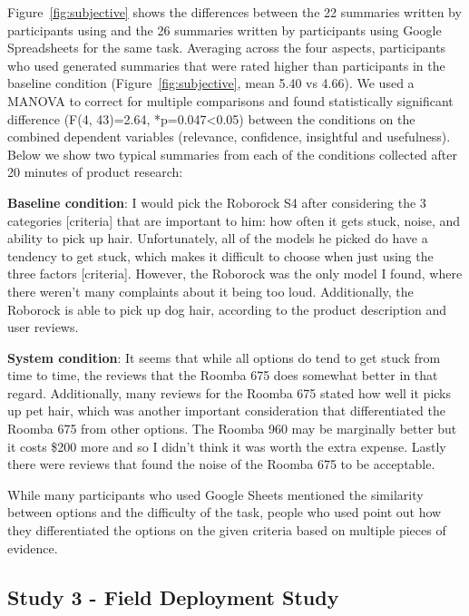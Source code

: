 Figure~\ref{fig:subjective} shows the differences between the 22 summaries written by participants using \SYSTEM and the 26 summaries written by participants using Google Spreadsheets for the same task. Averaging across the four aspects, participants who used \SYSTEM generated summaries that were rated higher than participants in the baseline condition (Figure~\ref{fig:subjective}, mean 5.40 vs 4.66). We used a MANOVA to correct for multiple comparisons and found statistically significant difference (F(4, 43)=2.64, *p=0.047<0.05) between the conditions on the combined dependent variables (relevance, confidence, insightful and usefulness). Below we show two typical summaries from each of the conditions collected after 20 minutes of product research:

\begin{tightquote}
\textbf{Baseline condition}: I would pick the Roborock S4 after considering the 3 categories [criteria] that are important to him: how often it gets stuck, noise, and ability to pick up hair. Unfortunately, all of the models he picked do have a tendency to get stuck, which makes it difficult to choose when just using the three factors [criteria]. However, the Roborock was the only model I found, where there weren't many complaints about it being too loud. Additionally, the Roborock is able to pick up dog hair, according to the product description and user reviews.

\textbf{System condition}: It seems that while all options do tend to get stuck from time to time, the reviews that the Roomba 675 does somewhat better in that regard. Additionally, many reviews for the Roomba 675 stated how well it picks up pet hair, which was another important consideration that differentiated the Roomba 675 from other options. The Roomba 960 may be marginally better but it costs \$200 more and so I didn't think it was worth the extra expense. Lastly there were reviews that found the noise of the Roomba 675 to be acceptable. 

\end{tightquote}

While many participants who used Google Sheets mentioned the similarity between options and the difficulty of the task, people who used \SYSTEM point out how they differentiated the options on the given criteria based on multiple pieces of evidence. 



\subsection{Study 3 - Field Deployment Study}

